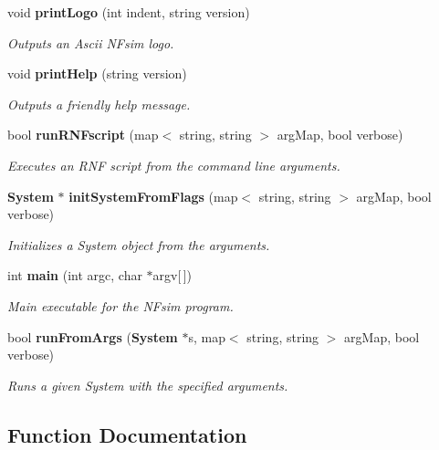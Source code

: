 \begin{CompactItemize}
\item 
void {\bf printLogo} (int indent, string version)
\begin{CompactList}\small\item\em Outputs an Ascii NFsim logo. \item\end{CompactList}\item 
void {\bf printHelp} (string version)
\begin{CompactList}\small\item\em Outputs a friendly help message. \item\end{CompactList}\item 
bool {\bf runRNFscript} (map$<$ string, string $>$ argMap, bool verbose)
\begin{CompactList}\small\item\em Executes an RNF script from the command line arguments. \item\end{CompactList}\item 
{\bf System} $\ast$ {\bf initSystemFromFlags} (map$<$ string, string $>$ argMap, bool verbose)
\begin{CompactList}\small\item\em Initializes a System object from the arguments. \item\end{CompactList}\item 
int {\bf main} (int argc, char $\ast$argv[$\,$])
\begin{CompactList}\small\item\em Main executable for the NFsim program. \item\end{CompactList}\item 
bool {\bf runFromArgs} ({\bf System} $\ast$s, map$<$ string, string $>$ argMap, bool verbose)
\begin{CompactList}\small\item\em Runs a given System with the specified arguments. \item\end{CompactList}\end{CompactItemize}


\subsection{Function Documentation}
